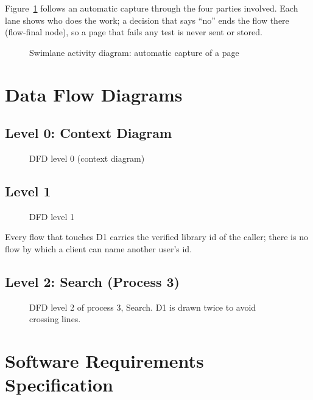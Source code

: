 Figure~\ref{fig:swimlane} follows an automatic capture through the four
parties involved. Each lane shows who does the work; a decision that says
``no'' ends the flow there (flow-final node), so a page that fails any test
is never sent or stored.

\begin{figure}[H]
\centering

\caption{Swimlane activity diagram: automatic capture of a page}
\label{fig:swimlane}
\end{figure}

\section{Data Flow Diagrams}

\subsection{Level 0: Context Diagram}

\begin{figure}[H]
\centering

\caption{DFD level 0 (context diagram)}
\label{fig:dfd0}
\end{figure}

\subsection{Level 1}

\begin{figure}[H]
\centering

\caption{DFD level 1}
\label{fig:dfd1}
\end{figure}

Every flow that touches D1 carries the verified library id of the caller;
there is no flow by which a client can name another user's id.

\subsection{Level 2: Search (Process 3)}

\begin{figure}[H]
\centering

\caption{DFD level 2 of process 3, Search. D1 is drawn twice to avoid crossing lines.}
\label{fig:dfd2}
\end{figure}

\section{Software Requirements Specification}

